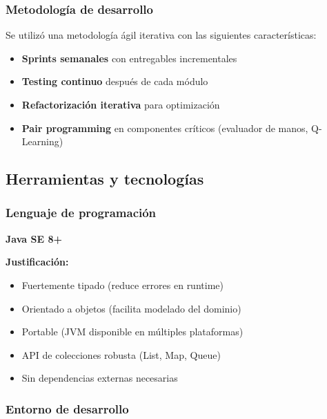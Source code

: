 \documentclass[12pt,a4paper]{article}
\begin{document}
\subsubsection{Metodología de desarrollo}

Se utilizó una metodología ágil iterativa con las siguientes características:

\begin{itemize}
    \item \textbf{Sprints semanales} con entregables incrementales
    \item \textbf{Testing continuo} después de cada módulo
    \item \textbf{Refactorización iterativa} para optimización
    \item \textbf{Pair programming} en componentes críticos (evaluador de manos, Q-Learning)
\end{itemize}

\subsection{Herramientas y tecnologías}

\subsubsection{Lenguaje de programación}

\textbf{Java SE 8+}

\textbf{Justificación:}
\begin{itemize}
    \item Fuertemente tipado (reduce errores en runtime)
    \item Orientado a objetos (facilita modelado del dominio)
    \item Portable (JVM disponible en múltiples plataformas)
    \item API de colecciones robusta (List, Map, Queue)
    \item Sin dependencias externas necesarias
\end{itemize}

\subsubsection{Entorno de desarrollo}
\end{document}
